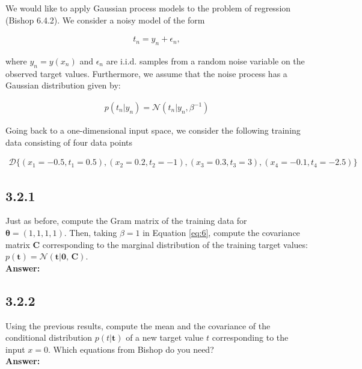 \documentclass[a4paper]{article}
\begin{document}
We would like to apply Gaussian process models to the problem of regression (Bishop 6.4.2). We consider a noisy model of the form 

\begin{align*}
t_n = y_n + \epsilon_n,
\end{align*}

where $y_n = y(x_n)$ and $\epsilon_n$ are i.i.d. samples from a random noise variable on the observed target values. Furthermore, we assume that the noise process has a Gaussian distribution given by:

\begin{eqnarray} \label{eq:6}
p(t_n | y_n) = \mathcal{N}(t_n | y_n, \beta^{-1})
\end{eqnarray}

Going back to a one-dimensional input space, we consider the following training data consisting of four data points 

\begin{align*}
\mathcal{D} \{ (x_1 = -0.5, t_1 = 0.5), (x_2 = 0.2, t_2 = -1), (x_3 = 0.3, t_3 = 3),(x_4 = -0.1, t_4 = -2.5) \}
\end{align*}


\subsection*{3.2.1}

Just as before, compute the Gram matrix of the training data for $\boldsymbol{\theta} = (1,1,1,1)$. Then, taking $\beta = 1$ in Equation \ref{eq:6}, compute the covariance matrix \textbf{C} corresponding to the marginal distribution of the training target values: $p(\textbf{t}) = \mathcal{N}(\textbf{t} | \textbf{0, C})$.\\

\textbf{Answer:}\\






\subsection*{3.2.2}

Using the previous results, compute the mean and the covariance of the conditional distribution $p(t | \textbf{t})$ of a new target value $t$ corresponding to the input $x = 0$. Which equations from Bishop do you need?\\

\textbf{Answer:}\\
\end{document}
